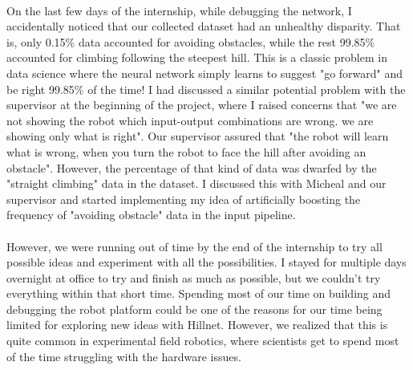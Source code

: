 \paragraph{}
On the last few days of the internship, while debugging the network, I accidentally noticed that our collected dataset had an unhealthy disparity. That is, only 0.15\% data accounted for avoiding obstacles, while the rest 99.85\% accounted for climbing following the steepest hill. This is a classic problem in data science where the neural network simply learns to suggest "go forward" and be right 99.85\% of the time! I had discussed a similar potential problem with the supervisor at the beginning of the project, where I raised concerns that "we are not showing the robot which input-output combinations are wrong. we are showing only what is right". Our supervisor assured that "the robot will learn what is wrong, when you turn the robot to face the hill after avoiding an obstacle". However, the percentage of that kind of data was dwarfed by the "straight climbing" data in the dataset. I discussed this with Micheal and our supervisor and started implementing my idea of artificially boosting the frequency of "avoiding obstacle" data in the input pipeline.

\paragraph{}
However, we were running out of time by the end of the internship to try all possible ideas and experiment with all the possibilities. I stayed for multiple days overnight at office to try and finish as much as possible, but we couldn't try everything within that short time. Spending most of our time on building and debugging the robot platform could be one of the reasons for our time being limited for exploring new ideas with Hillnet. However, we realized that this is quite common in experimental field robotics, where scientists get to spend most of the time struggling with the hardware issues. 